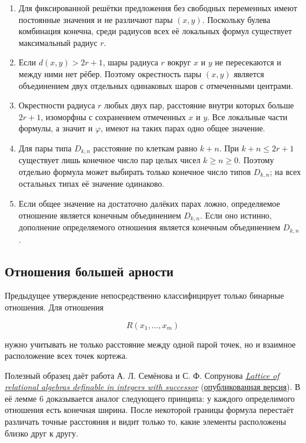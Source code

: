 \begin{enumerate}
  \begin{itemize}
  \tightlist
  \item
    локальных формул вокруг $(x,y)$;
  \item
    предложений без свободных переменных, утверждающих существование нескольких
    достаточно удалённых точек с заданным локальным свойством.
  \end{itemize}
\item
  Для фиксированной решётки предложения без свободных переменных имеют
  постоянные значения и не различают пары $(x,y)$. Поскольку булева комбинация
  конечна, среди радиусов всех её локальных формул существует максимальный
  радиус $r$.
\item
  Если $d(x,y) > 2r+1$, шары радиуса $r$ вокруг $x$ и $y$ не пересекаются и
  между ними нет рёбер. Поэтому окрестность пары $(x,y)$ является объединением
  двух отдельных одинаковых шаров с отмеченными центрами.
\item
  Окрестности радиуса $r$ любых двух пар, расстояние внутри которых больше
  $2r+1$, изоморфны с сохранением отмеченных $x$ и $y$. Все локальные части
  формулы, а значит и $\varphi$, имеют на таких парах одно общее значение.
\item
  Для пары типа $D_{k,n}$ расстояние по клеткам равно $k+n$. При
  $k+n\le2r+1$ существует лишь конечное число пар целых чисел
  $k\ge n\ge0$. Поэтому отдельно формула может выбирать только конечное число
  типов $D_{k,n}$; на всех остальных типах её значение одинаково.
\item
  Если общее значение на достаточно далёких парах ложно, определяемое
  отношение является конечным объединением $D_{k,n}$. Если оно истинно,
  дополнение определяемого отношения является конечным объединением
  $D_{k,n}$.
\end{enumerate}

\subsection{Отношения большей арности}

Предыдущее утверждение непосредственно классифицирует только бинарные
отношения. Для отношения

$$R(x_1,\ldots,x_m)$$

нужно учитывать не только расстояние между одной парой точек, но и взаимное
расположение всех точек кортежа.

Полезный образец даёт работа А. Л. Семёнова и С. Ф. Сопрунова
\href{https://arxiv.org/abs/1201.4439}{\emph{Lattice of relational algebras definable in integers with successor}}
(\href{https://www.mathnet.ru/eng/im9107}{опубликованная версия}). В её лемме 6
доказывается аналог следующего принципа: у каждого определимого отношения есть
конечная ширина. После некоторой границы формула перестаёт различать точные
расстояния и видит только то, какие элементы расположены близко друг к другу.

